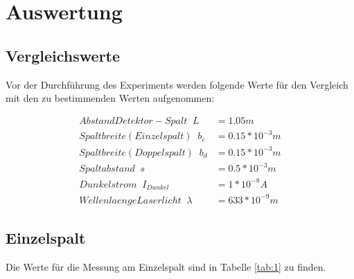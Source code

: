 \section{Auswertung}

\subsection{Vergleichswerte}

Vor der Durchführung des Experiments werden folgende Werte für den Vergleich mit den zu bestimmenden Werten aufgenommen:

\begin{align*}
    Abstand Detektor-Spalt \; \;  L &= 1.05m \\
    Spaltbreite (Einzelspalt)\; \; b_e &= 0.15*10^{-3}m \\
    Spaltbreite (Doppelspalt)\; \; b_d &= 0.15*10^{-3}m \\
    Spaltabstand\; \; s &= 0.5*10^{-3}m \\
    Dunkelstrom\; \; I_{Dunkel} &= 1*10^{-8}A\\
    Wellenlaenge Laserlicht\; \; \lambda &= 633*10^{-9}m 
\end{align*}

\subsection{Einzelspalt}

Die Werte für die Messung am Einzelspalt sind in Tabelle \ref{tab:1} zu finden.

